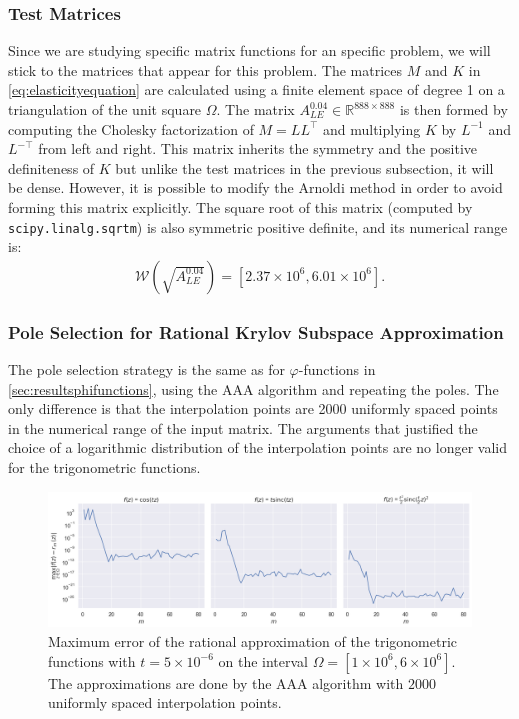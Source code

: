 \subsubsection*{Test Matrices}
Since we are studying specific matrix functions for an specific problem, we will stick to the
matrices that appear for this problem.
The matrices $M$ and $K$ in \eqref{eq:elasticityequation} are calculated using a finite element space
of degree 1 on a triangulation of the unit square $\Omega$.
The matrix $A_{LE}^{0.04} \in \mathbb{R}^{888\times888}$ is then formed by computing the Cholesky
factorization of $M = LL^{\top}$ and multiplying $K$ by $L^{-1}$ and $L^{-\top}$ from left and right.
This matrix inherits the symmetry and the positive definiteness of $K$ but unlike the test matrices
in the previous subsection, it will be dense.
However, it is possible to modify the Arnoldi method in order to avoid forming this matrix
explicitly.
The square root of this matrix (computed by \texttt{scipy.linalg.sqrtm}) is also symmetric
positive definite, and its numerical range is:
\begin{gather*}
    \mathcal{W}\left(\sqrt{A_{LE}^{0.04}}\right) = [2.37 \times 10^{6}, 6.01 \times 10^{6}].
\end{gather*}

\subsubsection*{Pole Selection for Rational Krylov Subspace Approximation}
The pole selection strategy is the same as for $\varphi$-functions in \autoref{sec:resultsphifunctions},
using the AAA algorithm and repeating the poles.
The only difference is that the interpolation points are 2000 uniformly spaced points in the
numerical range of the input matrix. The arguments that justified the choice of a logarithmic
distribution of the interpolation points are no longer valid for the trigonometric functions.

\begin{figure}[h]
    \centering
    \includegraphics[width=.9\textwidth]{img/trigonometric/AAA_errors_t5e-06.png}
    \caption{
        Maximum error of the rational approximation of the trigonometric functions
        with $t=5\times10^{-6}$ on the interval $\Omega = [1 \times 10^{6}, 6 \times 10^{6}]$.
        The approximations are done by the AAA algorithm with $2000$ uniformly spaced
        interpolation points.
    }
    \label{fig:trigonometricAAAerrors}
\end{figure}

